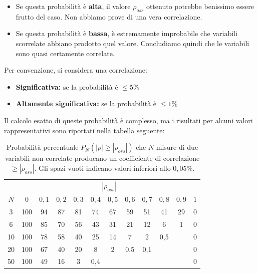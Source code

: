 \documentclass[openany,a4paper,12pt]{book}
\theoremstyle{remark}
\begin{document}
\begin{itemize}
    \item Se questa probabilità è \textbf{alta}, il valore $\rho_{oss}$ ottenuto potrebbe benissimo essere frutto del caso. Non abbiamo prove di una vera correlazione.
    \item Se questa probabilità è \textbf{bassa}, è estremamente improbabile che variabili scorrelate abbiano prodotto quel valore. Concludiamo quindi che le variabili sono quasi certamente correlate.
\end{itemize}

Per convenzione, si considera una correlazione:
\begin{itemize}
    \item \textbf{Significativa:} se la probabilità è $\le 5\%$
    \item \textbf{Altamente significativa:} se la probabilità è $\le 1\%$
\end{itemize}

Il calcolo esatto di queste probabilità è complesso, ma i risultati per alcuni valori rappresentativi sono riportati nella tabella seguente:

\begin{table}[h!]
    \centering
    \caption{Probabilità percentuale $P_N(|\rho| \ge |\rho_{oss}|)$ che $N$ misure di due variabili non correlate producano un coefficiente di correlazione $\ge |\rho_{oss}|$. Gli spazi vuoti indicano valori inferiori allo $0,05\%$.}
    \vspace{2mm}
    \renewcommand{\arraystretch}{1.2} %
    \begin{tabular}{c | c c c c c c c c c c c}
        \hline
        & \multicolumn{11}{c}{$|\rho_{oss}|$} \\
        $N$ & $0$ & $0,1$ & $0,2$ & $0,3$ & $0,4$ & $0,5$ & $0,6$ & $0,7$ & $0,8$ & $0,9$ & $1$ \\
        \hline
        3  & 100 & 94 & 87 & 81 & 74  & 67 & 59  & 51  & 41  & 29 & 0 \\
        6  & 100 & 85 & 70 & 56 & 43  & 31 & 21  & 12  & 6   & 1  & 0 \\
        10 & 100 & 78 & 58 & 40 & 25  & 14 & 7   & 2   & 0,5 &    & 0 \\
        20 & 100 & 67 & 40 & 20 & 8   & 2  & 0,5 & 0,1 &     &    & 0 \\
        50 & 100 & 49 & 16 & 3  & 0,4 &    &     &     &     &    & 0 \\
        \hline
    \end{tabular}
\end{table}
\end{document}
